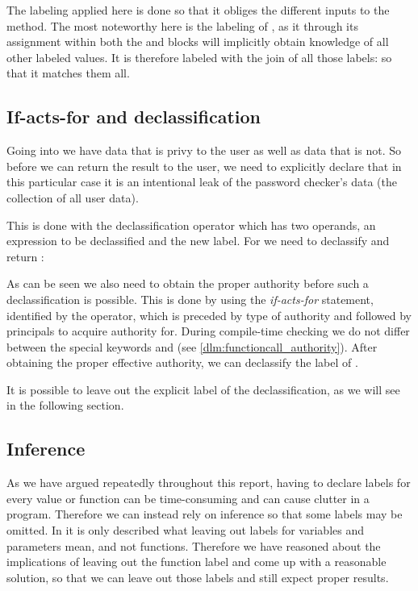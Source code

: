 The labeling applied here is done so that it obliges the different inputs to the method.
The most noteworthy here is the labeling of , as it through its assignment within both the  and  blocks will implicitly obtain knowledge of all other labeled values.
It is therefore labeled with the join of all those labels:  so that it matches them all.

\subsection{If-acts-for and declassification}\label{ctif:informal:ifactsfor_declassify}
Going into  we have data that is privy to the user as well as data that is not.
So before we can return the result to the user, we need to explicitly declare that in this particular case it is an intentional leak of the password checker's data (the collection of all user data).

This is done with the declassification operator \dlmc{<| |>} which has two operands, an expression to be declassified and the new label.
For  we need to declassify and return :\\
\begin{minipage}{\linewidth}

\end{minipage}

As can be seen we also need to obtain the proper authority before such a declassification is possible.
This is done by using the \emph{if-acts-for} statement, identified by the  operator, which is preceded by type of authority and followed by principals to acquire authority for.
During compile-time checking we do not differ between the special keywords  and  (see \cref{dlm:functioncall_authority}).
After obtaining the proper effective authority, we can declassify the label of .

It is possible to leave out the explicit label of the declassification, as we will see in the following section.

\subsection{Inference}\label{ctif:informal:inference}
As we have argued repeatedly throughout this report, having to declare labels for every value or function can be time-consuming and can cause clutter in a program.
Therefore we can instead rely on inference so that some labels may be omitted.
In \cite{myers1997} it is only described what leaving out labels for variables and parameters mean, and not functions.
Therefore we have reasoned about the implications of leaving out the function label and come up with a reasonable solution, so that we can leave out those labels and still expect proper results.

